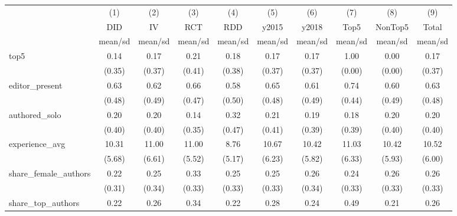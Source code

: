 {
\def\sym#1{\ifmmode^{#1}\else\(^{#1}\)\fi}
\begin{tabular}{l*{9}{c}}
\hline\hline
            &\multicolumn{1}{c}{(1)}&\multicolumn{1}{c}{(2)}&\multicolumn{1}{c}{(3)}&\multicolumn{1}{c}{(4)}&\multicolumn{1}{c}{(5)}&\multicolumn{1}{c}{(6)}&\multicolumn{1}{c}{(7)}&\multicolumn{1}{c}{(8)}&\multicolumn{1}{c}{(9)}\\
            &\multicolumn{1}{c}{DID}&\multicolumn{1}{c}{IV}&\multicolumn{1}{c}{RCT}&\multicolumn{1}{c}{RDD}&\multicolumn{1}{c}{y2015}&\multicolumn{1}{c}{y2018}&\multicolumn{1}{c}{Top5}&\multicolumn{1}{c}{NonTop5}&\multicolumn{1}{c}{Total}\\
            &     mean/sd&     mean/sd&     mean/sd&     mean/sd&     mean/sd&     mean/sd&     mean/sd&     mean/sd&     mean/sd\\
\hline
top5        &        0.14&        0.17&        0.21&        0.18&        0.17&        0.17&        1.00&        0.00&        0.17\\
            &      (0.35)&      (0.37)&      (0.41)&      (0.38)&      (0.37)&      (0.37)&      (0.00)&      (0.00)&      (0.37)\\
editor\_present&        0.63&        0.62&        0.66&        0.58&        0.65&        0.61&        0.74&        0.60&        0.63\\
            &      (0.48)&      (0.49)&      (0.47)&      (0.50)&      (0.48)&      (0.49)&      (0.44)&      (0.49)&      (0.48)\\
authored\_solo&        0.20&        0.20&        0.14&        0.32&        0.21&        0.19&        0.18&        0.20&        0.20\\
            &      (0.40)&      (0.40)&      (0.35)&      (0.47)&      (0.41)&      (0.39)&      (0.39)&      (0.40)&      (0.40)\\
experience\_avg&       10.31&       11.00&       11.00&        8.76&       10.67&       10.42&       11.03&       10.42&       10.52\\
            &      (5.68)&      (6.61)&      (5.52)&      (5.17)&      (6.23)&      (5.82)&      (6.33)&      (5.93)&      (6.00)\\
share\_female\_authors&        0.22&        0.25&        0.33&        0.25&        0.25&        0.26&        0.24&        0.26&        0.26\\
            &      (0.31)&      (0.34)&      (0.33)&      (0.33)&      (0.33)&      (0.34)&      (0.33)&      (0.33)&      (0.33)\\
share\_top\_authors&        0.22&        0.26&        0.34&        0.22&        0.28&        0.24&        0.49&        0.21&        0.26\\

\end{tabular}}
